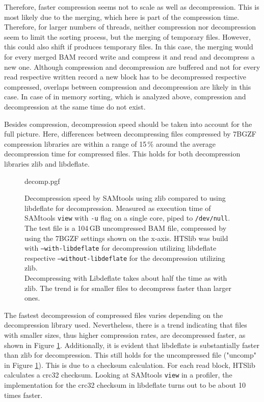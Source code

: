 Therefore, faster compression seems not to scale as well as decompression. This is most likely due to the merging, which here is part of the compression time. Therefore, for larger numbers of threads, neither compression nor decompression seem to limit the sorting process, but the merging of temporary files. However, this could also shift if \sort produces temporary files. In this case, the merging would for every merged BAM record write and compress it and read and decompress a new one. Although compression and decompression are buffered and not for every read respective written record a new block has to be decompressed respective compressed, overlaps between compression and decompression are likely in this case. In case of in memory sorting, which is analyzed above, compression and decompression at the same time do not exist. 


Besides compression, decompression speed should be taken into account for the full picture. Here, differences between decompressing files compressed by 7BGZF compression libraries are within a range of 15\,\% around the average decompression time for compressed files. This holds for both decompression libraries zlib and libdeflate.
\begin{figure}
        {decomp.pgf}
    \caption{Decompression speed by SAMtools using zlib compared to using libdeflate for decompression. Measured as execution time of SAMtools \texttt{view} with \texttt{-u} flag on a single core, piped to \texttt{/dev/null}. The test file is a 104\,GB uncompressed BAM file, compressed by \sort using the 7BGZF settings shown on the x-axis. HTSlib was build with \texttt{--with-libdeflate} for decompression utilizing libdeflate respective \texttt{--without-libdeflate} for the decompression utilizing zlib.\\
    Decompressing with Libdeflate takes about half the time as with zlib. The trend is for smaller files to decompress faster than larger ones.}
    \label{fig:decomp}
\end{figure}
The fastest decompression of compressed files varies depending on the decompression library used. Nevertheless, there is a trend indicating that files with smaller sizes, thus higher compression rates, are decompressed faster, as shown in Figure \ref{fig:decomp}. 
Additionally, it is evident that libdeflate is substantially faster than zlib for decompression. This still holds for the uncompressed file ("uncomp" in Figure \ref{fig:decomp}). This is due to a checksum calculation. For each read block, HTSlib calculates a crc32 checksum. Looking at SAMtools \texttt{view} in a profiler, the implementation for the crc32 checksum in libdeflate turns out to be about 10 times faster. \\

